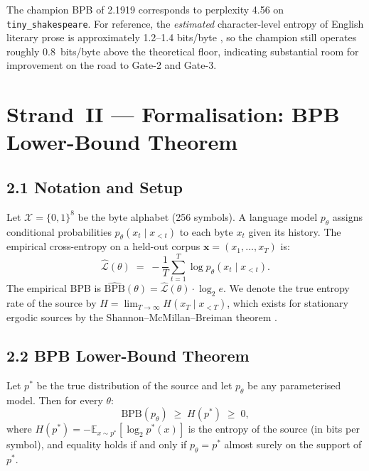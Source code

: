 The champion BPB of 2.1919 corresponds to perplexity 4.56 on
\texttt{tiny\_shakespeare}.  For reference, the
\emph{estimated} character-level entropy of English literary prose is
approximately 1.2–1.4 bits/byte \citep{cover_thomas_info}, so the
champion still operates roughly 0.8~bits/byte above the theoretical
floor, indicating substantial room for improvement on the road to
Gate-2 and Gate-3.

\section{Strand~II — Formalisation: BPB Lower-Bound Theorem}
\label{sec:ch25-formalisation}

\subsection{2.1 Notation and Setup}
\label{subsec:ch25-notation}

Let $\mathcal{X} = \{0,1\}^8$ be the byte alphabet (256 symbols).
A language model $p_\theta$ assigns conditional probabilities
$p_\theta(x_t \mid x_{<t})$ to each byte $x_t$ given its history.
The empirical cross-entropy on a held-out corpus
$\mathbf{x} = (x_1, \ldots, x_T)$ is:
%
\begin{equation}
  \hat{\mathcal{L}}(\theta) \;=\; -\frac{1}{T}\sum_{t=1}^{T}
  \log p_\theta(x_t \mid x_{<t}).
  \label{eq:ce}
\end{equation}
%
The empirical BPB is $\widehat{\mathrm{BPB}}(\theta) = \hat{\mathcal{L}}(\theta)
\cdot \log_2 e$.  We denote the true entropy rate of the source by
$H = \lim_{T\to\infty} H(x_T \mid x_{<T})$,
which exists for stationary ergodic sources by the Shannon–McMillan–Breiman
theorem \citep{cover_thomas_info}.

\subsection{2.2 BPB Lower-Bound Theorem}
\label{subsec:ch25-theorem}

\begin{theorem}
\label{thm:bpb-lb}
Let $p^*$ be the true distribution of the source and let
$p_\theta$ be any parameterised model.  Then for every $\theta$:
%
\begin{equation}
  \mathrm{BPB}(p_\theta) \;\ge\; H(p^*) \;\ge\; 0,
  \label{eq:thm-bpb-lb}
\end{equation}
%
where $H(p^*) = -\mathbb{E}_{x \sim p^*}[\log_2 p^*(x)]$ is the
entropy of the source (in bits per symbol), and equality holds if
and only if $p_\theta = p^*$ almost surely on the support of $p^*$.
\end{theorem}

